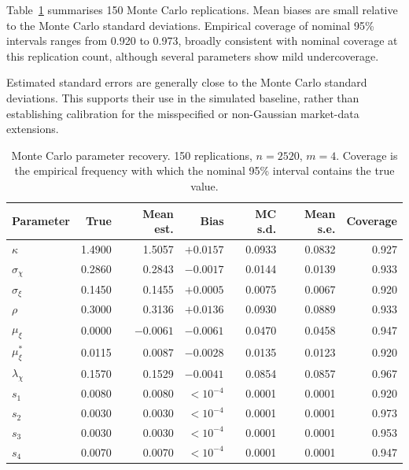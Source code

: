 \documentclass[journal]{IEEEtran}
\begin{document}
Table~\ref{tab:recovery} summarises 150 Monte Carlo replications. Mean biases are small relative to the Monte Carlo standard deviations. Empirical coverage of nominal 95\% intervals ranges from 0.920 to 0.973, broadly consistent with nominal coverage at this replication count, although several parameters show mild undercoverage.

Estimated standard errors are generally close to the Monte Carlo standard deviations. This supports their use in the simulated baseline, rather than establishing calibration for the misspecified or non-Gaussian market-data extensions.
\begin{table}[!t]
\centering
\caption{Monte Carlo parameter recovery. 150 replications, $n=2520$, $m=4$. Coverage is the empirical frequency with which the nominal 95\% interval contains the true value.}
\label{tab:recovery}
\small
\renewcommand{\arraystretch}{1.15}
\begin{tabular}{@{}lrrrrrr@{}}
\toprule
\textbf{Parameter} & \textbf{True} & \textbf{Mean est.} & \textbf{Bias} & \textbf{MC s.d.} & \textbf{Mean s.e.} & \textbf{Coverage} \\
\midrule
$\kappa$        & 1.4900 & 1.5057 & $+0.0157$ & 0.0933 & 0.0832 & 0.927 \\
$\sigma_\chi$   & 0.2860 & 0.2843 & $-0.0017$ & 0.0144 & 0.0139 & 0.933 \\
$\sigma_\xi$    & 0.1450 & 0.1455 & $+0.0005$ & 0.0075 & 0.0067 & 0.920 \\
$\rho$          & 0.3000 & 0.3136 & $+0.0136$ & 0.0930 & 0.0889 & 0.933 \\
$\mu_\xi$       & 0.0000 & $-0.0061$ & $-0.0061$ & 0.0470 & 0.0458 & 0.947 \\
$\mu_\xi^{*}$   & 0.0115 & 0.0087 & $-0.0028$ & 0.0135 & 0.0123 & 0.920 \\
$\lambda_\chi$  & 0.1570 & 0.1529 & $-0.0041$ & 0.0854 & 0.0857 & 0.967 \\
$s_1$           & 0.0080 & 0.0080 & $<10^{-4}$ & 0.0001 & 0.0001 & 0.920 \\
$s_2$           & 0.0030 & 0.0030 & $<10^{-4}$ & 0.0001 & 0.0001 & 0.973 \\
$s_3$           & 0.0030 & 0.0030 & $<10^{-4}$ & 0.0001 & 0.0001 & 0.953 \\
$s_4$           & 0.0070 & 0.0070 & $<10^{-4}$ & 0.0001 & 0.0001 & 0.947 \\
\bottomrule
\end{tabular}
\end{table}
\end{document}
